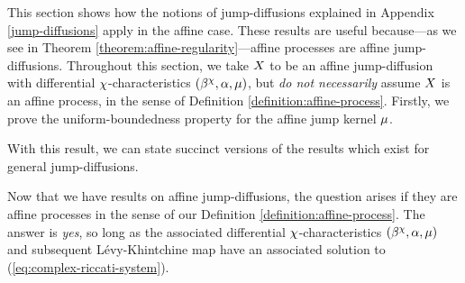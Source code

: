 This section shows how the notions of jump-diffusions explained in Appendix \ref{jump-diffusions} apply in the affine case.
These results are useful because---as we see in Theorem \ref{theorem:affine-regularity}---affine processes are affine jump-diffusions.
Throughout this section, we take $X$ to be an affine jump-diffusion with differential $\chi$-characteristics $(\beta^\chi, \alpha, \mu)$, but \emph{do not necessarily} assume $X$ is an affine process, in the sense of Definition \ref{definition:affine-process}.
Firstly, we prove the uniform-boundedness property for the affine jump kernel $\mu$.



With this result, we can state succinct versions of the results which exist for general jump-diffusions.





Now that we have results on affine jump-diffusions, the question arises if they are affine processes in the sense of our Definition \ref{definition:affine-process}.
The answer is \emph{yes}, so long as the associated differential $\chi$-characteristics $(\beta^\chi, \alpha, \mu)$ and subsequent L\'evy-Khintchine map have an associated solution to (\ref{eq:complex-riccati-system}).



